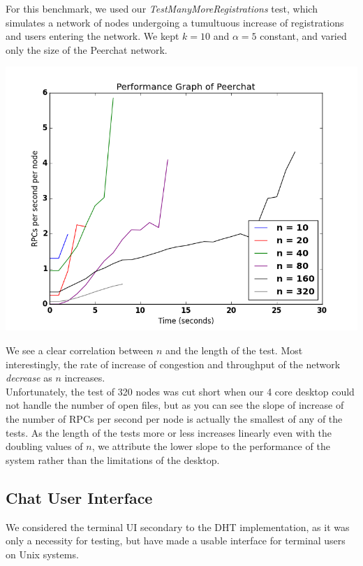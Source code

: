 \documentclass{article}
\begin{document}
For this benchmark, we used our \textit{TestManyMoreRegistrations} test, which simulates a network of nodes undergoing a tumultuous increase of registrations and users entering the network. We kept $k = 10$ and $\alpha = 5$ constant, and varied only the size of the Peerchat network. 

\includegraphics[scale=0.8]{performance-sweep}

We see a clear correlation between $n$ and the length of the test. Most interestingly, the rate of increase of congestion and throughput of the network \textit{decrease} as $n$ increases. \\

Unfortunately, the test of 320 nodes was cut short when our 4 core desktop could not handle the number of open files, but as you can see the slope of increase of the number of RPCs per second per node is actually the smallest of any of the tests. As the length of the tests more or less increases linearly even with the doubling values of $n$, we attribute the lower slope to the performance of the system rather than the limitations of the desktop. 

\subsection{Chat User Interface}

We considered the terminal UI secondary to the DHT implementation, as it was only a necessity for testing, but have made a usable interface for terminal users on Unix systems. \\
\end{document}
